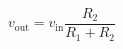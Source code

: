 \documentclass[tikz]{standalone}
\begin{document}
  \begin{equation*}
	v_\text{out}=v_\text{in}\frac{R_2}{R_1+R_2}
	\end{equation*}
\end{document}
